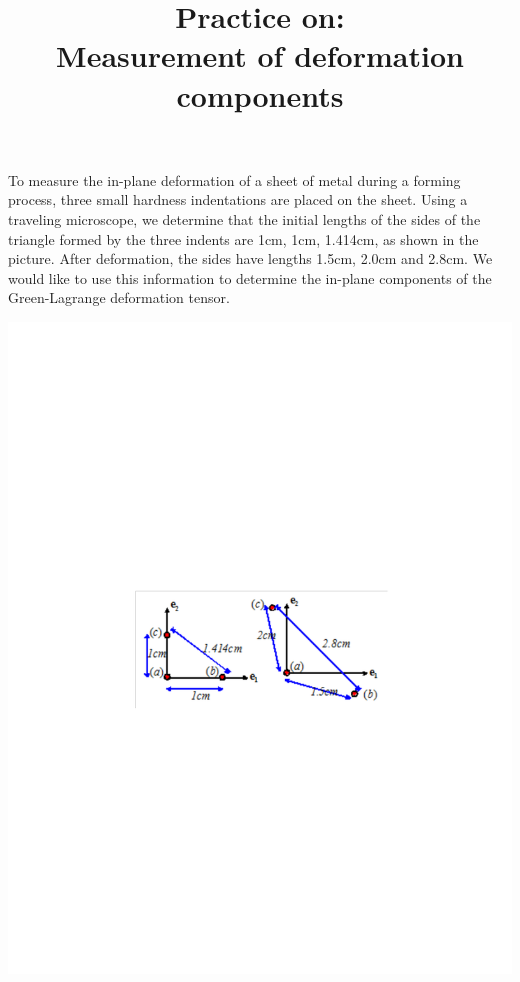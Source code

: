 \documentclass[letter,12pt]{article}
\begin{document}
\pagestyle{fancy}

\title{\textbf{Practice on: \\
		 Measurement of deformation components}}
\date{}

\maketitle

\vspace{-1cm}


To measure the in-plane deformation of a sheet of metal during a forming process,  three small hardness indentations are placed on the sheet.  Using a traveling microscope, we determine that the initial lengths of the sides of the triangle formed by the three indents are 1cm, 1cm, 1.414cm, as shown in the picture.  After deformation, the sides have lengths 1.5cm, 2.0cm and 2.8cm.  We  would like to use this information to determine the in-plane components of the Green-Lagrange deformation tensor.  

\begin{center}
	\includegraphics[scale=.6]{figures/INDENT}
\end{center}
\end{document}
